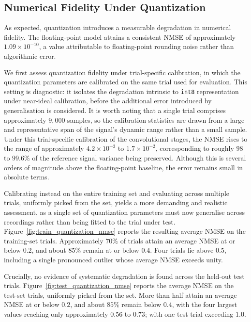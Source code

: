 \documentclass[12pt,DIV16,BCOR12mm,a4paper,footinclude=false,headinclude,parskip=half-,twoside,openright,cleardoublepage=empty,toc=index,bibliography=totoc,listof=totoc]{scrreprt}
\numberwithin{equation}{chapter}
\begin{document}
  \subsection{Numerical Fidelity Under Quantization}

  As expected, quantization introduces a measurable degradation in numerical fidelity.
  The floating-point model attains a consistent NMSE of approximately $1.09\times10^{-10}$,
  a value attributable to floating-point rounding noise rather than algorithmic error.

  We first assess quantization fidelity under trial-specific calibration, in which the
  quantization parameters are calibrated on the same trial used for evaluation. This
  setting is diagnostic: it isolates the degradation intrinsic to \texttt{int8}
  representation under near-ideal calibration, before the additional error introduced by
  generalisation is considered. It is worth noting that a single trial comprises
  approximately $9{,}000$ samples, so the calibration statistics are drawn from a large
  and representative span of the signal's dynamic range rather than a small sample. Under
  this trial-specific calibration of the convolutional stages, the NMSE rises to the range
  of approximately $4.2\times10^{-3}$ to $1.7\times10^{-2}$, corresponding to roughly $98$
  to $99.6\%$ of the reference signal variance being preserved. Although this is several
  orders of magnitude above the floating-point baseline, the error remains small in
  absolute terms.

  Calibrating instead on the entire training set and evaluating across multiple trials,
  uniformly picked from the set,
  yields a more demanding and realistic assessment, as a single set of quantization
  parameters must now generalise across recordings rather than being fitted to the trial
  under test. Figure~\ref{fig:train_quantization_nmse} reports the resulting average NMSE
  on the training-set trials. Approximately $70\%$ of trials attain an average NMSE at or
  below $0.2$, and about $85\%$ remain at or below $0.4$. Four trials lie above $0.5$,
  including a single pronounced outlier whose average NMSE exceeds unity.

  Crucially, no evidence of systematic degradation is found across the held-out test
  trials. Figure~\ref{fig:test_quantization_nmse} reports the average NMSE on the
  test-set trials, uniformly picked from the set. More than half attain an average NMSE 
  at or below $0.2$, and about $85\%$ remain below $0.4$, with the four largest values 
  reaching only approximately $0.56$ to $0.73$; with one test trial exceeding $1.0$.
\end{document}
